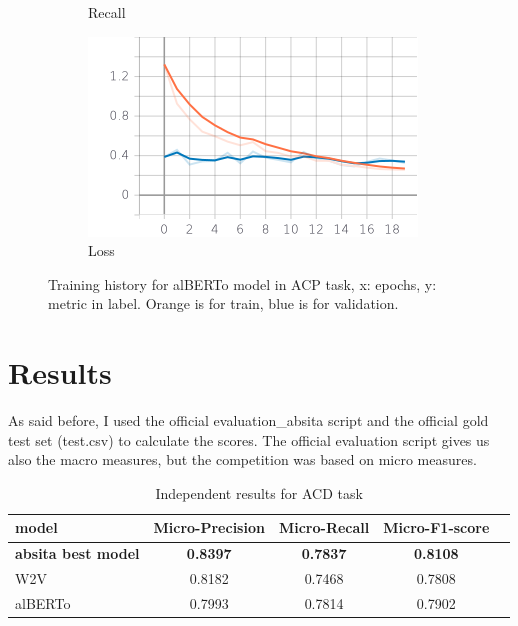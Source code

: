 \documentclass{article}
\begin{document}
\begin{figure}
\begin{subfigure}{.33\textwidth}
 		            \caption{Recall}
 		            \label{alberto_acp_epoch_recall}
		        \end{subfigure}
                \begin{subfigure}{.33\textwidth}
 		            \centering
 		            \includegraphics[width=\textwidth]{imgs/plots/alberto_acp_epoch_loss.png}
 		            \caption{Loss}
 		            \label{alberto_acp_epoch_loss}
		        \end{subfigure}
		    \caption{Training history for alBERTo model in ACP task, x: epochs, y: metric in label.
                    \color{orange} Orange is for train, \color{blue} blue is for validation.\color{black}}
		    \label{alberto_acp_history}
	        \end{figure}


    \section{Results}\label{sec:s5}
        As said before, I used the official evaluation\_absita script and the official gold test set (test.csv) to calculate the scores.
        The official evaluation script gives us also the macro measures, but the competition was based on micro measures.
                \begin{table}[h!]
                    \begin{center}
                        \caption{Independent results for ACD task}
                        \label{tab:table2}
                        \begin{tabular}{l|c|c|c|r}
                            \textbf{model} & \textbf{Micro-Precision} & \textbf{Micro-Recall} & \textbf{Micro-F1-score}\\
                            \hline
                                \textbf{absita best model} & \textbf{0.8397} & \textbf{0.7837} & \textbf{0.8108}\\
                                W2V & 0.8182 & 0.7468 & 0.7808\\
                                alBERTo & 0.7993 & 0.7814 & 0.7902\\
                        \end{tabular}
                    \end{center}
                \end{table}
\end{document}
